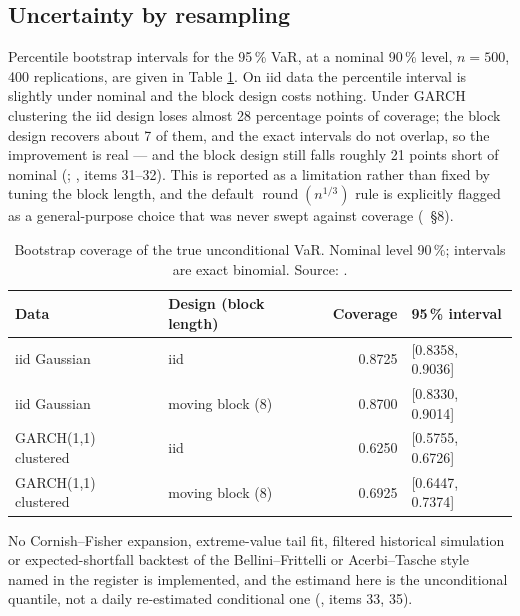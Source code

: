 \documentclass[11pt,a4paper]{article}
\begin{document}
\subsection{Uncertainty by resampling}
Percentile bootstrap intervals for the 95\,\% VaR, at a nominal 90\,\% level, $n = 500$,
400 replications, are given in Table \ref{tab:bootstrap}. On iid data the percentile interval
is slightly under nominal and the block design costs nothing. Under GARCH clustering the iid
design loses almost 28 percentage points of coverage; the block design recovers about 7 of
them, and the exact intervals do not overlap, so the improvement is real --- and the block
design still falls roughly 21 points short of nominal
(;
, items 31--32). This is reported as a limitation rather than fixed
by tuning the block length, and the default $\operatorname{round}(n^{1/3})$ rule is explicitly
flagged as a general-purpose choice that was never swept against coverage
(~\S8).

\begin{table}[t]
\caption[Bootstrap coverage of the true unconditional VaR]{Bootstrap coverage of the true unconditional VaR. Nominal level 90\,\%; intervals are
exact binomial. Source: .}
\label{tab:bootstrap}
\centering\small
\begin{tabular}{llrl}
\toprule
Data & Design (block length) & Coverage & 95\,\% interval \\
\midrule
iid Gaussian & iid & 0.8725 & [0.8358, 0.9036] \\
iid Gaussian & moving block (8) & 0.8700 & [0.8330, 0.9014] \\
GARCH(1,1) clustered & iid & 0.6250 & [0.5755, 0.6726] \\
GARCH(1,1) clustered & moving block (8) & 0.6925 & [0.6447, 0.7374] \\
\bottomrule
\end{tabular}
\end{table}

No Cornish--Fisher expansion, extreme-value tail fit, filtered historical simulation or
expected-shortfall backtest of the Bellini--Frittelli or Acerbi--Tasche style named in the
register is implemented, and the estimand here is the unconditional quantile, not a
daily re-estimated conditional one (, items 33, 35).
\end{document}
